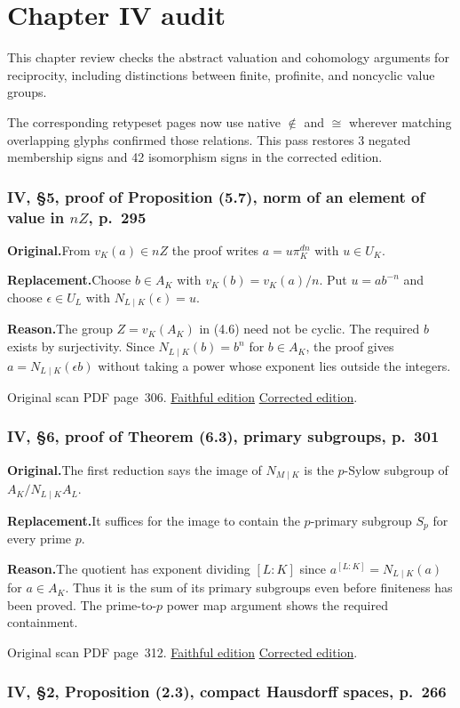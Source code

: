 \documentclass[11pt,a4paper]{article}
\newcommand{\original}{\par\smallskip\noindent\textbf{Original.}\enspace}
\newcommand{\replacement}{\par\smallskip\noindent\textbf{Replacement.}\enspace}
\newcommand{\reason}{\par\smallskip\noindent\textbf{Reason.}\enspace}
\newcommand{\editionlink}[3]{\href{#1\#errata.#2}{#3}}
\newcommand{\location}[2]{%
  \par\smallskip\noindent Original scan PDF page~#2.\enspace
  \editionlink{Neukirch_Faithful.pdf}{#1}{Faithful edition}
  \quad\editionlink{Neukirch_Corrected.pdf}{#1}{Corrected edition}.}
\begin{document}
\clearpage
\part{Chapter IV audit}
This chapter review checks the abstract valuation and cohomology arguments for reciprocity, including distinctions between finite, profinite, and noncyclic value groups.\par The corresponding retypeset pages now use native \(\notin\) and \(\cong\) wherever matching overlapping glyphs confirmed those relations. This pass restores 3 negated membership signs and 42 isomorphism signs in the corrected edition.
\setcounter{section}{99}
\section{IV, \S5, proof of Proposition (5.7), norm of an element of value in $nZ$, p.~295}\label{errata:item:100}

\original From $v_K(a)\in nZ$ the proof writes $a=u\pi_K^{dn}$ with $u\in U_K$.
\replacement Choose $b\in A_K$ with $v_K(b)=v_K(a)/n$. Put $u=ab^{-n}$ and choose $\epsilon\in U_L$ with $N_{L\mid K}(\epsilon)=u$.
\reason The group $Z=v_K(A_K)$ in (4.6) need not be cyclic. The required $b$ exists by surjectivity. Since $N_{L\mid K}(b)=b^n$ for $b\in A_K$, the proof gives $a=N_{L\mid K}(\epsilon b)$ without taking a power whose exponent lies outside the integers.
\location{100}{306}

\setcounter{section}{100}
\section{IV, \S6, proof of Theorem (6.3), primary subgroups, p.~301}\label{errata:item:101}

\original The first reduction says the image of $N_{M\mid K}$ is the $p$-Sylow subgroup of $A_K/N_{L\mid K}A_L$.
\replacement It suffices for the image to contain the $p$-primary subgroup $S_p$ for every prime $p$.
\reason The quotient has exponent dividing $[L:K]$ since $a^{[L:K]}=N_{L\mid K}(a)$ for $a\in A_K$. Thus it is the sum of its primary subgroups even before finiteness has been proved. The prime-to-$p$ power map argument shows the required containment.
\location{101}{312}

\setcounter{section}{101}
\section{IV, \S2, Proposition (2.3), compact Hausdorff spaces, p.~266}\label{errata:item:102}
\end{document}
